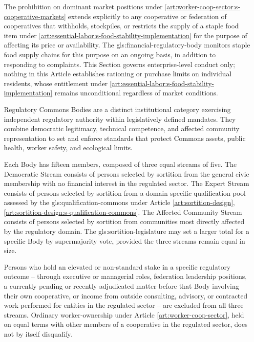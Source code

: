 The prohibition on dominant market positions under \ref{art:worker-coop-sector:s-cooperative-markets} extends explicitly to any cooperative or federation of cooperatives that withholds, stockpiles, or restricts the supply of a staple food item under \ref{art:essential-labor:s-food-stability-implementation} for the purpose of affecting its price or availability. The \gls{gls:financial-regulatory-body} monitors staple food supply chains for this purpose on an ongoing basis, in addition to responding to complaints. This Section governs enterprise-level conduct only; nothing in this Article establishes rationing or purchase limits on individual residents, whose entitlement under \ref{art:essential-labor:s-food-stability-implementation} remains unconditional regardless of market conditions.


Regulatory Commons Bodies are a distinct institutional category exercising independent regulatory authority within legislatively defined mandates. They combine democratic legitimacy, technical competence, and affected community representation to set and enforce standards that protect Commons assets, public health, worker safety, and ecological limits.

Each Body has fifteen members, composed of three equal streams of five. The Democratic Stream consists of persons selected by sortition from the general civic membership with no financial interest in the regulated sector. The Expert Stream consists of persons selected by sortition from a domain-specific qualification pool assessed by the \gls{gls:qualification-commons} under Article \ref{art:sortition-design}, \ref{art:sortition-design:s-qualification-commons}. The Affected Community Stream consists of persons selected by sortition from communities most directly affected by the regulatory domain. The \gls{gls:sortition-legislature} may set a larger total for a specific Body by supermajority vote, provided the three streams remain equal in size.

Persons who hold an elevated or non-standard stake in a specific regulatory outcome -- through executive or managerial roles, federation leadership positions, a currently pending or recently adjudicated matter before that Body involving their own cooperative, or income from outside consulting, advisory, or contracted work performed for entities in the regulated sector -- are excluded from all three streams. Ordinary worker-ownership under Article \ref{art:worker-coop-sector}, held on equal terms with other members of a cooperative in the regulated sector, does not by itself disqualify.

